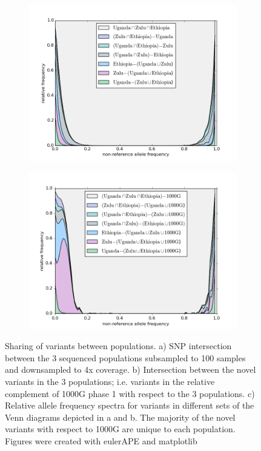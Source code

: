 \begin{figure}[htp]
\begin{subfigure}[b]{0.45\textwidth}
    \caption{}
  \end{subfigure}
  \begin{subfigure}[b]{0.45\textwidth}
    \includegraphics[width=\textwidth]{fig/venn3_stackplot_SNPs.png}
    \caption{}
  \end{subfigure}
  \begin{subfigure}[b]{0.45\textwidth}
    \includegraphics[width=\textwidth]{fig/venn3_stackplot_complement_1000G_SNPs.png}
    \caption{}
  \end{subfigure}
  \caption{Sharing of variants between populations. a) SNP intersection between the 3 sequenced populations subsampled to 100 samples and downsampled to 4x coverage. b) Intersection between the novel variants in the 3 populations; i.e. variants in the relative complement of \gls{1000G} phase 1 with respect to the 3 populations. c) Relative allele frequency spectra for variants in different sets of the Venn diagrams depicted in a and b. The majority of the novel variants with respect to \gls{1000G} are unique to each population. Figures were created with eulerAPE\cite{10.1371/journal.pone.0101717} and matplotlib\cite{Hunter2007}}
  \label{fig:intersection}
\end{figure}